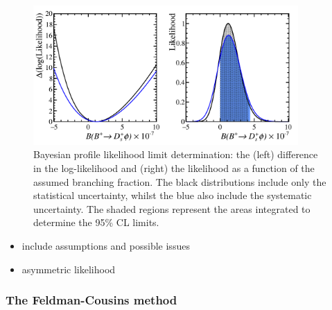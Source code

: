 {%
\begin{figure}[!h]
    \centering
        \includegraphics[width=0.9\textwidth]{figs/B2DsPhi/Likelihood_limits.pdf}
         \caption{Bayesian profile likelihood limit determination: the (left) difference in the log-likelihood and (right) the likelihood as a function of the assumed \decay{\Bp}{\Dsp\phiz} branching fraction. The black distributions include only the statistical uncertainty, whilst the blue also include the systematic uncertainty. The shaded regions represent the areas integrated to determine the 95\% CL limits. }
    \label{fig:B2DsPhi_limit_likelihood}   
\end{figure}

{\color{Red}
\begin{itemize}
\item include assumptions and possible issues
\item asymmetric likelihood 
\end{itemize}
}
\subsubsection{The Feldman-Cousins method}

}
